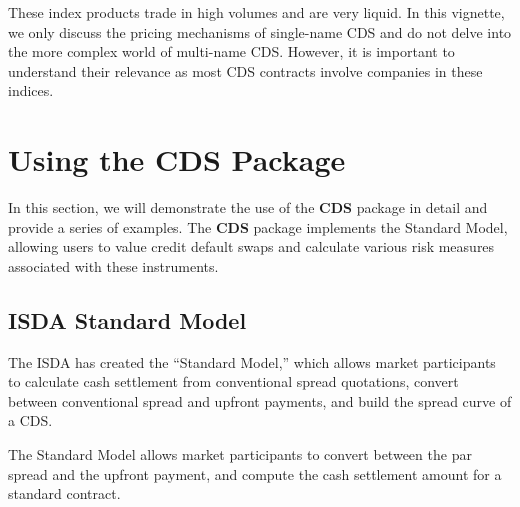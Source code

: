 \documentclass{jss}
\begin{document}
These index products trade in high volumes and are very liquid. In this vignette, we only discuss the pricing mechanisms of single-name CDS and do not delve into the more complex world of multi-name CDS. However, it is important to understand their relevance as most CDS contracts involve companies in these indices.

\newpage
\section{Using the CDS Package}
\label{CDSpkg}

In this section, we will demonstrate the use of the \textbf{CDS} package in detail and provide a series of examples. The \textbf{CDS} package implements the Standard Model, allowing users to value credit default swaps and calculate various risk measures associated with these instruments. 

\subsection{ISDA Standard Model}
\label{sec:ISDAStMod}

The ISDA has created the ``Standard Model,'' which allows market participants to calculate cash settlement from conventional spread quotations, convert between conventional spread and upfront payments, and build the spread curve of a CDS. 

The Standard Model allows market participants to convert between the par spread and the upfront payment, and compute the cash settlement amount for a standard contract.
\end{document}
